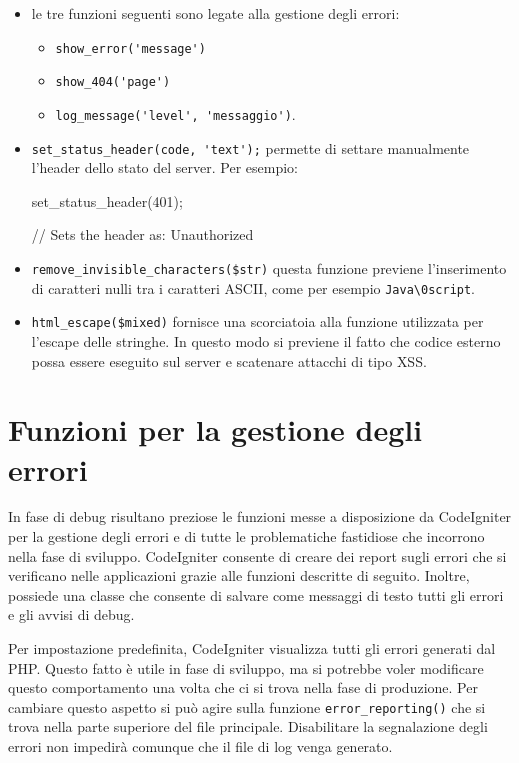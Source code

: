 \begin{itemize}
\item le tre funzioni seguenti sono legate alla gestione degli errori: 
\begin{itemize}
\item \verb|show_error('message')|
\item \verb|show_404('page')|
\item \verb|log_message('level', 'messaggio')|.
\end{itemize}

\item \verb|set_status_header(code, 'text');| permette di settare manualmente l'header dello stato del server. Per esempio:

\begin{code}
set_status_header(401);

// Sets the header as: Unauthorized
\end{code}

\item \verb|remove_invisible_characters($str)| questa funzione previene l'inserimento di caratteri nulli tra i caratteri ASCII, come per esempio \verb|Java\0script|.

\item \verb|html_escape($mixed)| fornisce una scorciatoia alla funzione  utilizzata per l'escape delle stringhe. In questo modo si previene il fatto che codice esterno possa essere eseguito sul server e scatenare attacchi di tipo \ac{XSS}.
\end{itemize}

\section*{Funzioni per la gestione degli errori}
In fase di debug risultano preziose le funzioni messe a disposizione da CodeIgniter per la gestione degli errori e di tutte le problematiche fastidiose che incorrono nella fase di sviluppo. CodeIgniter consente di creare dei report sugli errori che si verificano nelle applicazioni grazie alle funzioni descritte di seguito. Inoltre, possiede una classe che consente di salvare come messaggi di testo tutti gli errori e gli avvisi di debug.

Per impostazione predefinita, CodeIgniter visualizza tutti gli errori generati dal \ac{PHP}. Questo fatto è utile in fase di sviluppo, ma si potrebbe voler modificare questo comportamento una volta che ci si trova nella fase di produzione. Per cambiare questo aspetto si può agire sulla funzione \verb|error_reporting()| che si trova nella parte superiore del file  principale. Disabilitare la segnalazione degli errori non impedirà comunque che il file di log venga generato. 

